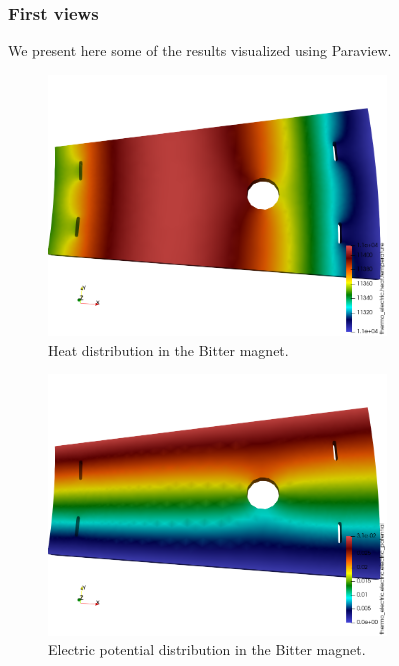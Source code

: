 \documentclass[12pt]{article}
\begin{document}
\subsubsection{First views}
We present here some of the results visualized using Paraview.
\begin{figure}[H]
  \centering
  \includegraphics[width=0.8\textwidth]{images/heat.png}
  \caption{Heat distribution in the Bitter magnet.}
\end{figure}
\begin{figure}[H]
  \centering
  \includegraphics[width=0.8\textwidth]{images/electric_potential.png}
  \caption{Electric potential distribution in the Bitter magnet.}
\end{figure}
\end{document}
